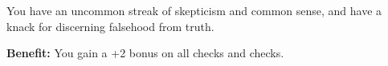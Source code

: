 
You have an uncommon streak of skepticism and common sense, and have a knack for discerning falsehood from truth.

\textbf{Benefit:} You gain a +2 bonus on all  checks and  checks.